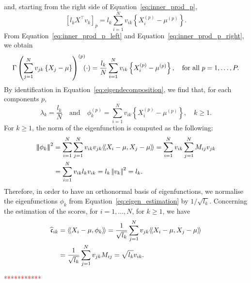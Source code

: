 and, starting from the right side of Equation~\eqref{eq:inner_prod_p},
\begin{equation}\label{eq:inner_prod_p_right}
    [l_k X^\top v_k]_p = l_k \sum_{i = 1}^N v_{ik} \left\{X_i^{(p)} - \mu^{(p)}\right\}.
\end{equation}
From Equation~\eqref{eq:inner_prod_p_left} and Equation~\eqref{eq:inner_prod_p_right}, we obtain
\begin{equation}
    \Gamma\left(\sum_{j = 1}^N v_{jk} \left\{X_j - \mu\right\}\right)^{(p)}\mkern-9mu(\cdot) = \frac{l_k}{N} \sum_{i = 1}^N v_{ik}\left\{X_i^{(p)} - \mu^{(p)}\right\}, \quad\text{for all}~ p = 1, \dots, P.
\end{equation}
By identification in Equation~\eqref{eq:eigendecomposition}, we find that, for each components $p$,
\begin{equation}\label{eq:eigen_estimation}
\lambda_k = \frac{l_k}{N} \quad\text{and}\quad \phi_k^{(p)} = \sum_{i = 1}^N v_{ik}\left\{X_i^{(p)} - \mu^{(p)}\right\}, \quad k \geq 1.
\end{equation}
For $k \geq 1$, the norm of the eigenfunction is computed as the following:
\begin{align*}
\normH{\phi_k}^2 &= \sum_{i = 1}^N \sum_{j = 1}^N v_{ik} v_{jk}\inH{X_i - \mu}{X_j - \mu} = \sum_{i = 1}^N v_{ik} \sum_{j = 1}^N M_{ij} v_{jk} \\
    &= \sum_{i = 1}^N v_{ik} l_k v_{ik} = l_k \normLp{v_k}^2 = l_k. \\
\end{align*}
Therefore, in order to have an orthonormal basis of eigenfunctions, we normalise the eigenfunctions $\phi_k$ from Equation~\eqref{eq:eigen_estimation} by $1 / \sqrt{l_k}$.
Concerning the estimation of the scores, for $i = 1, \dots, N$, for $k \geq 1$, we have
\begin{align}
    \widehat{\mathfrak{c}}_{ik} &= \langle\!\langle X_i - \mu, \phi_k\rangle\!\rangle = \frac{1}{\sqrt{l_k}}\sum_{j = 1}^N v_{jk} \langle\!\langle X_i - \mu, X_j - \mu\rangle\!\rangle\\
    &= \frac{1}{\sqrt{l_k}}\sum_{j = 1}^N v_{jk}M_{ij} = \sqrt{l_k}v_{ik}.\\
\end{align}

\textcolor{red}{***********}

